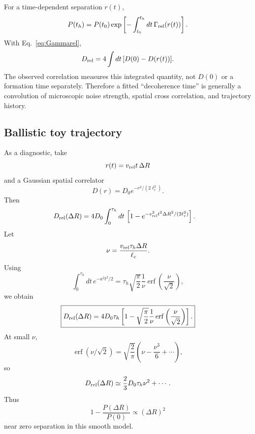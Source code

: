 \documentclass[11pt]{article}
\begin{document}
For a time-dependent separation $r(t)$,
\begin{equation}
P(t_h)
=P(t_0)
\exp\left[-\int_{t_0}^{t_h}dt\,\Gamma_{\rm rel}(r(t))\right].
\end{equation}
With Eq.~\eqref{eq:Gammarel},
\begin{equation}
D_{\rm rel}
=4\int dt\,[D(0)-D(r(t))].
\end{equation}
The observed correlation measures this integrated quantity, not $D(0)$ or a formation time separately. Therefore a fitted ``decoherence time'' is generally a convolution of microscopic noise strength, spatial cross correlation, and trajectory history.

\subsection{Ballistic toy trajectory}

As a diagnostic, take
\begin{equation}
r(t)=v_{\rm rel}t\,\Delta R
\end{equation}
and a Gaussian spatial correlator
\begin{equation}
D(r)=D_0e^{-r^2/(2\ell_c^2)}.
\end{equation}
Then
\begin{align}
D_{\rm rel}(\Delta R)
&=4D_0\int_0^{\tau_h}dt\,
\left[1-e^{-v_{\rm rel}^2t^2\Delta R^2/(2\ell_c^2)}\right].
\end{align}
Let
\begin{equation}
\nu=\frac{v_{\rm rel}\tau_h\Delta R}{\ell_c}.
\end{equation}
Using
\begin{equation}
\int_0^{\tau_h}dt\,e^{-a^2t^2/2}
=\tau_h\sqrt{\frac\pi2}\frac{1}{\nu}
\operatorname{erf}\left(\frac{\nu}{\sqrt2}\right),
\end{equation}
we obtain
\begin{equation}
\boxed{
D_{\rm rel}(\Delta R)
=4D_0\tau_h
\left[
1-\sqrt{\frac\pi2}\frac1\nu
\operatorname{erf}\left(\frac{\nu}{\sqrt2}\right)
\right].
}
\label{eq:gaussDR}
\end{equation}
At small $\nu$,
\begin{equation}
\operatorname{erf}(\nu/\sqrt2)
=\sqrt{\frac2\pi}\left(\nu-\frac{\nu^3}{6}+\cdots\right),
\end{equation}
so
\begin{equation}
D_{\rm rel}(\Delta R)
\simeq\frac{2}{3}D_0\tau_h\nu^2+\cdots.
\end{equation}
Thus
\begin{equation}
1-\frac{P(\Delta R)}{P(0)}\propto(\Delta R)^2
\end{equation}
near zero separation in this smooth model.
\end{document}
